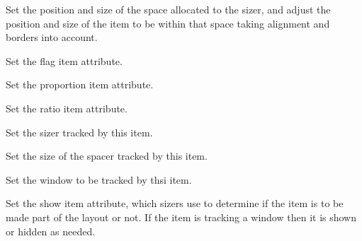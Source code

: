 
Set the position and size of the space allocated to the sizer, and
adjust the position and size of the item to be within that space
taking alignment and borders into account.


\label{wxsizeritemsetflag}


Set the flag  item attribute.


\label{wxsizeritemsetinitsize}



\label{wxsizeritemsetproportion}


Set the proportion item attribute.

\label{wxsizeritemsetratio}




Set the ratio item attribute.


\label{wxsizeritemsetsizer}


Set the sizer tracked by this item.


\label{wxsizeritemsetspacer}


Set the size of the spacer tracked by this item.


\label{wxsizeritemsetwindow}


Set the window to be tracked by thsi item.


\label{wxsizeritemshow}


Set the show item attribute, which sizers use to determine if the item
is to be made part of the layout or not.  If the item is tracking a
window then it is shown or hidden as needed.

